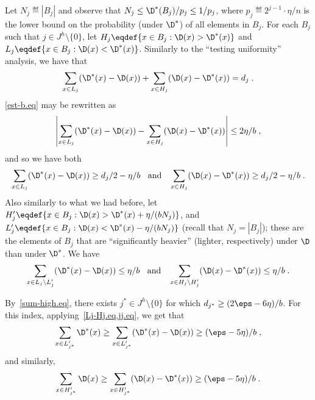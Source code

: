 Let ${N_j} \eqdef |B_j|$ and observe that
$N_j \leq \D^\ast(B_j)/p_j\leq 1/p_j$, where
$p_j \eqdef 2^{j-1}\cdot\eta/n$ is the lower bound on
the probability (under $\D^\ast$) of all elements in $B_j$.
For each $B_j$ such that $j \in J^h\setminus \{0\}$, let
$H_j \eqdef \{x \in B_j: \D(x) > \D^\ast(x)\}$
and $L_j \eqdef \{x\in B_j: \D(x)< \D^\ast(x)\}$.
Similarly to the ``testing uniformity'' analysis, we have that
\begin{equation}
\sum_{x\in L_j} (\D^\ast(x) - \D(x))
+ \sum_{x\in H_j} (\D(x) - \D^\ast(x)) = d_j\;.
\end{equation}
\cref{est-b.eq} may be rewritten as
\begin{equation}
\left| \sum_{x\in L_j} (\D^\ast(x) - \D(x))
- \sum_{x\in H_j} (\D(x) - \D^\ast(x)) \right|
\leq 2\eta/b\;,
\end{equation}
and so we have both
\begin{equation}
\sum_{x\in L_j} (\D^\ast(x) - \D(x)) \geq d_j/2 - \eta/b
\;\;
\mbox{ and }
\;\;
\sum_{x\in H_j} (\D(x) - \D^\ast(x)) \geq d_j/2 - \eta/b\;.
\label{Lj-Hj.eq}
\end{equation}
Also similarly to what we had before, let
$H'_j \eqdef \{x \in B_j: \D(x) > \D^\ast(x)+ \eta/(b N_j)\}$,
and $L'_j  \eqdef \{x\in B_j: \D(x)< \D^\ast(x)-\eta/(b N_j)\}$
(recall that $N_j = |B_j|$); these are the elements of $B_j$ that are
``significantly heavier'' (lighter, respectively) under $\D$ than
under $\D^\ast$.  We have
\begin{equation}
\sum_{x\in L_j\setminus L'_j} (\D^\ast(x) - \D(x)) \leq \eta/b
\;\;
\mbox{ and }
\;\;
\sum_{x\in H_j\setminus H'_j} ({\D(x) - \D^\ast(x)}) \leq \eta/b\;.
\label{jj.eq}
\end{equation}

By~\cref{sum-high.eq}, there exists $j^\ast \in J^h\setminus \{0\}$ for which $d_{j^\ast} \geq (2\eps-6\eta)/b$. For this index, applying~\cref{Lj-Hj.eq,jj.eq}, we get that
\begin{equation}
\sum_{x\in L'_{j^\ast}} \D^\ast(x) \geq
\sum_{x\in L'_{j^\ast}} (\D^\ast(x) - \D(x))
\geq (\eps - 5\eta)/b \;,
\end{equation}
and similarly,
\begin{equation}
\sum_{x\in H'_{j^\ast}} \D(x) \geq
\sum_{x\in H'_{j^\ast}} (\D(x) - \D^\ast(x))
\geq (\eps - 5\eta)/b\;.
\end{equation}

